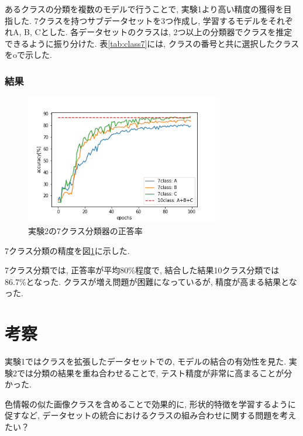 \documentclass[twocolumn]{jarticle}     %
\begin{document}
あるクラスの分類を複数のモデルで行うことで, 実験1より高い精度の獲得を目指した.
7クラスを持つサブデータセットを3つ作成し, 学習するモデルをそれぞれA, B, Cとした.
各データセットのクラスは, 2つ以上の分類器でクラスを推定できるように振り分けた.
表\ref{tab:class7}には, クラスの番号と共に選択したクラスをoで示した.

\subsubsection{結果}

\begin{figure}[tb]
	\begin{center}
		\includegraphics[clip,width=8.5cm]{accuracy7.png}
		\caption{実験2の7クラス分類器の正答率}
		\label{fig:accuracy7}
	\end{center}
\end{figure}

7クラス分類の精度を図\ref{fig:accuracy7}に示した.

7クラス分類では, 正答率が平均80\%程度で, 結合した結果10クラス分類では86.7\%となった.
クラスが増え問題が困難になっているが, 精度が高まる結果となった.

\section{考察}

実験1ではクラスを拡張したデータセットでの, モデルの結合の有効性を見た.
実験2では分類の結果を重ね合わせることで, テスト精度が非常に高まることが分かった.

色情報の似た画像クラスを含めることで効果的に, 形状的特徴を学習するように促すなど, データセットの統合におけるクラスの組み合わせに関する問題を考えたい？
\end{document}
